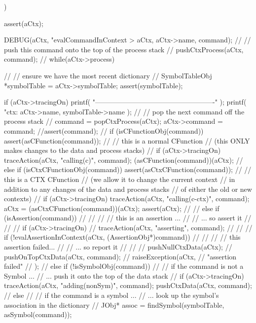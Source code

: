 ) {
  assert(aCtx);
  
  DEBUG(aCtx, "evalCommandInContext > %
    aCtx, aCtx->name, command);
  //
  // push this command onto the top of the process stack
  //
  pushCtxProcess(aCtx, command);
  //
  while(aCtx->process) {
    //
    // ensure we have the most recent dictionary
    //
    SymbolTableObj *symbolTable = aCtx->symbolTable;
    assert(symbolTable);
    
    if (aCtx->tracingOn) {
      printf(
        "\n----------------------------------------------------\n"
      );
      printf(
        "ctx: %
        aCtx->name, symbolTable->name
      );
    }
    //
    // pop the next command off the process stack
    //
    command = popCtxProcess(aCtx);
    aCtx->command = command;
    //assert(command);
    //
    if (isCFunctionObj(command)) {
      assert(asCFunction(command));
      //
      // this is a normal CFunction
      // (this ONLY makes changes to the data and process stacks)
      //
      if (aCtx->tracingOn)
        traceAction(aCtx, "calling(c)", command);
      (asCFunction(command))(aCtx);
      //
    } else if (isCtxCFunctionObj(command)) {
        assert(asCtxCFunction(command));
        //
        // this is a CTX CFunction
        // (we allow it to change the current context
        //  in addition to any changes of the data and process stacks
        //  of either the old or new contexts)
        //
        if (aCtx->tracingOn) 
          traceAction(aCtx, "calling(c-ctx)", command);
        aCtx = (asCtxCFunction(command))(aCtx);
        assert(aCtx);
        //    
//    } else if (isAssertion(command)) {
//      //
//      // this is an assertion ...
//      //   ... so assert it 
//      //
//      if (aCtx->tracingOn) 
//        traceAction(aCtx, "asserting", command);
//      //
//      if (!evalAssertionInContext(aCtx, (AssertionObj*)command)) {
//        //
//        // this assertion failed... 
//        //   ... so report it
//        //
//        pushNullCtxData(aCtx);
//        pushOnTopCtxData(aCtx, command);
//        raiseException(aCtx,
//          "assertion failed"
//        );
//      }
    } else if (!isSymbolObj(command)) {
      //
      // if the command is not a Symbol ...
      //  ...  push it onto the top of the data stack
      //
      if (aCtx->tracingOn)
        traceAction(aCtx, "adding(nonSym)", command);
      pushCtxData(aCtx, command);
      //
   } else {
      //
      // if the command is a symbol ...
      //  ... look up the symbol's association in the dictionary
      //
      JObj* assoc = findSymbol(symbolTable, asSymbol(command));
}}}
